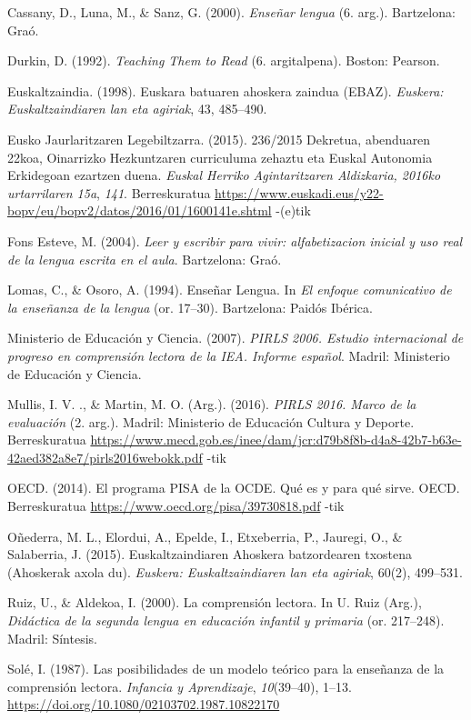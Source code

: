 \documentclass[
]{book}
\begin{document}
Cassany, D., Luna, M., \& Sanz, G. (2000). \emph{Enseñar lengua} (6. arg.). Bartzelona: Graó.

Durkin, D. (1992). \emph{Teaching Them to Read} (6. argitalpena). Boston: Pearson.

Euskaltzaindia. (1998). Euskara batuaren ahoskera zaindua (EBAZ). \emph{Euskera: Euskaltzaindiaren lan eta agiriak}, 43, 485--490.

Eusko Jaurlaritzaren Legebiltzarra. (2015). 236/2015 Dekretua, abenduaren 22koa, Oinarrizko Hezkuntzaren curriculuma zehaztu eta Euskal Autonomia Erkidegoan ezartzen duena. \emph{Euskal Herriko Agintaritzaren Aldizkaria, 2016ko urtarrilaren 15a}, \emph{141}. Berreskuratua \url{https://www.euskadi.eus/y22-bopv/eu/bopv2/datos/2016/01/1600141e.shtml} -(e)tik

Fons Esteve, M. (2004). \emph{Leer y escribir para vivir: alfabetizacion inicial y uso real de la lengua escrita en el aula}. Bartzelona: Graó.

Lomas, C., \& Osoro, A. (1994). Enseñar Lengua. In \emph{El enfoque comunicativo de la enseñanza de la lengua} (or. 17--30). Bartzelona: Paidós Ibérica.

Ministerio de Educación y Ciencia. (2007). \emph{PIRLS 2006. Estudio internacional de progreso en comprensión lectora de la IEA. Informe español}. Madril: Ministerio de Educación y Ciencia.

Mullis, I. V. ., \& Martin, M. O. (Arg.). (2016). \emph{PIRLS 2016. Marco de la evaluación} (2. arg.). Madril: Ministerio de Educación Cultura y Deporte. Berreskuratua \url{https://www.mecd.gob.es/inee/dam/jcr:d79b8f8b-d4a8-42b7-b63e-42aed382a8e7/pirls2016webokk.pdf} -tik

OECD. (2014). El programa PISA de la OCDE. Qué es y para qué sirve. OECD. Berreskuratua \url{https://www.oecd.org/pisa/39730818.pdf} -tik

Oñederra, M. L., Elordui, A., Epelde, I., Etxeberria, P., Jauregi, O., \& Salaberria, J. (2015). Euskaltzaindiaren Ahoskera batzordearen txostena (Ahoskerak axola du). \emph{Euskera: Euskaltzaindiaren lan eta agiriak}, 60(2), 499--531.

Ruiz, U., \& Aldekoa, I. (2000). La comprensión lectora. In U. Ruiz (Arg.), \emph{Didáctica de la segunda lengua en educación infantil y primaria} (or. 217--248). Madril: Síntesis.

Solé, I. (1987). Las posibilidades de un modelo teórico para la enseñanza de la comprensión lectora. \emph{Infancia y Aprendizaje}, \emph{10}(39--40), 1--13. \url{https://doi.org/10.1080/02103702.1987.10822170}
\end{document}
